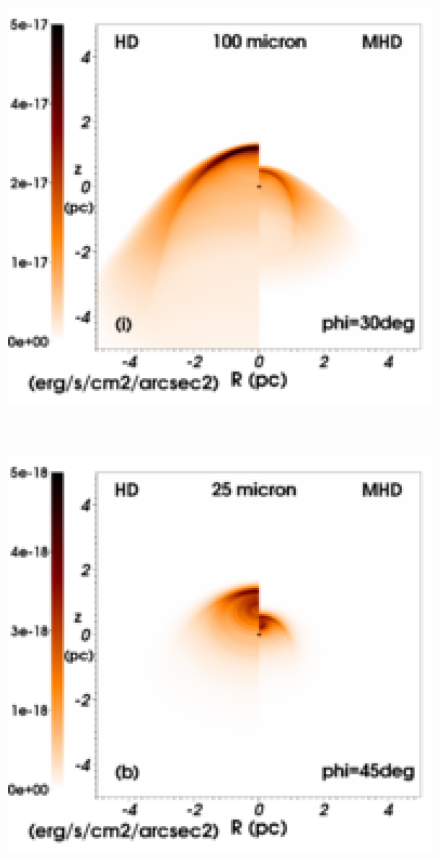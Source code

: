 \documentclass[useAMS,usenatbib]{mn2e}
\begin{document}
\begin{figure}
\begin{minipage}[b]{ 0.32\textwidth}
	\end{minipage}		
	\begin{minipage}[b]{ 0.32\textwidth}
			\centering
	        \includegraphics[width=1.0\textwidth]{./map_2040_30deg_lambda100_legend.eps}
	\end{minipage}	\\	
	\begin{minipage}[b]{ 0.32\textwidth}
			\centering
	        \includegraphics[width=1.0\textwidth]{./map_2040_45deg_lambda25_legend.eps}

\end{minipage}
\end{figure}
\end{document}
